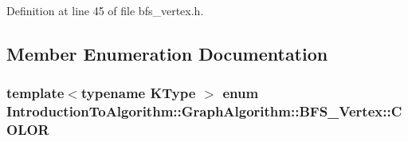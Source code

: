 Definition at line 45 of file bfs\+\_\+vertex.\+h.



\subsection{Member Enumeration Documentation}
\hypertarget{struct_introduction_to_algorithm_1_1_graph_algorithm_1_1_b_f_s___vertex_a3f00f12565def71750f1f163e0e52305}{}
\subsubsection[{C\+O\+L\+O\+R}]{\setlength{\rightskip}{0pt plus 5cm}template$<$typename K\+Type $>$ enum {\bf Introduction\+To\+Algorithm\+::\+Graph\+Algorithm\+::\+B\+F\+S\+\_\+\+Vertex\+::\+C\+O\+L\+O\+R}\hspace{0.3cm}{\ttfamily [strong]}}\label{struct_introduction_to_algorithm_1_1_graph_algorithm_1_1_b_f_s___vertex_a3f00f12565def71750f1f163e0e52305}
